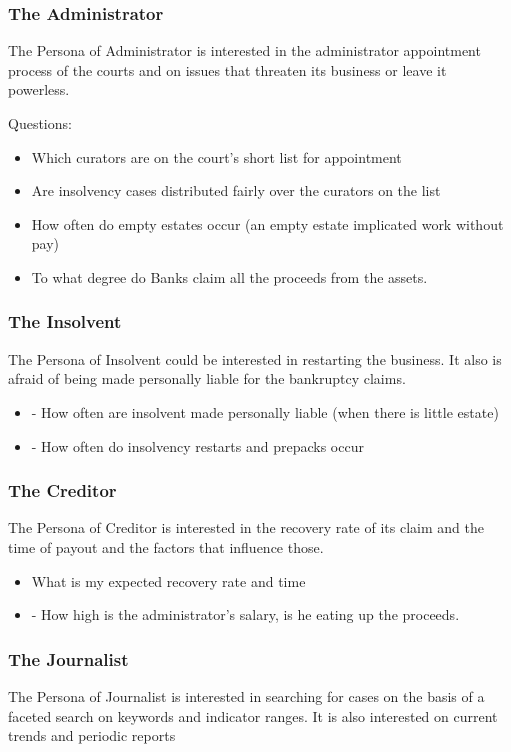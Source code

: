 \subsubsection{The Administrator}
The Persona of Administrator is interested in the administrator appointment process of the courts and on issues that threaten its business or leave it powerless.

Questions:
\begin{itemize}
	\item Which curators are on the court’s short list for appointment
	\item Are insolvency cases distributed fairly over the curators on the list
	\item How often do empty estates occur (an empty estate implicated work without pay)
	\item To what degree do Banks claim all the proceeds from the assets.
\end{itemize}

\subsubsection{The Insolvent}
The Persona of Insolvent could be interested in restarting the business. It also is afraid of being made personally liable for the bankruptcy claims.

\begin{itemize}
	\item -	How often are insolvent made personally liable (when there is little estate)
	\item -	How often do insolvency restarts and prepacks occur
\end{itemize}

\subsubsection{The Creditor}
The Persona of Creditor is interested in the recovery rate of its claim and the time of payout and the factors that influence those.

\begin{itemize}
	\item What is my expected recovery rate and time
	\item -	How high is the administrator’s salary, is he eating up the proceeds.
\end{itemize}

\subsubsection{The Journalist}
The Persona of Journalist is interested in searching for cases on the basis of a faceted search on keywords and indicator ranges. It is also interested on current trends and periodic reports

